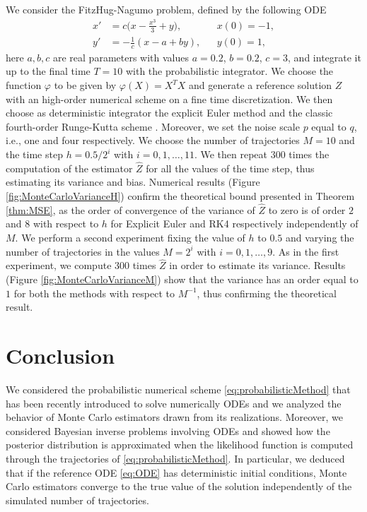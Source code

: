 \documentclass{siamart1116}
\numberwithin{theorem}{section}
\renewcommand{\phi}{\varphi}
\begin{document}
We consider the FitzHug-Nagumo problem, defined by the following ODE
\begin{equation}\label{eq:FitzNag}
\begin{aligned}
	x' &= c\big(x - \frac{x^3}{3} + y\big), && x(0) = -1, \\
	y' &= -\frac{1}{c}(x - a + by), && y(0) = 1,
\end{aligned}
\end{equation}
here $a, b, c$ are real parameters with values $a = 0.2$, $b = 0.2$, $c = 3$, and integrate it up to the final time $T = 10$ with the probabilistic integrator. We choose the function $\phi$ to be given by $\phi(X) = X^TX$ and generate a reference solution $Z$ with an high-order numerical scheme on a fine time discretization. We then choose as deterministic integrator the explicit Euler method and the classic fourth-order Runge-Kutta scheme \cite{HLW02}. Moreover, we set the noise scale $p$ equal to $q$, i.e., one and four respectively. We choose the number of trajectories $M = 10$ and the time step $h = 0.5 / 2^i$ with $i = 0, 1, \ldots, 11$. We then repeat $300$ times the computation of the estimator $\hat Z$ for all the values of the time step, thus estimating its variance and bias. Numerical results (Figure \ref{fig:MonteCarloVarianceH}) confirm the theoretical bound presented in Theorem \ref{thm:MSE}, as the order of convergence of the variance of $\hat{Z}$ to zero is of order $2$ and $8$ with respect to $h$ for Explicit Euler and RK4 respectively independently of $M$. We perform a second experiment fixing the value of $h$ to $0.5$ and varying the number of trajectories in the values $M = 2^i$ with $i = 0, 1, \ldots, 9$. As in the first experiment, we compute 300 times $\hat Z$ in order to estimate its variance. Results (Figure \ref{fig:MonteCarloVarianceM}) show that the variance has an order equal to $1$ for both the methods with respect to $M^{-1}$, thus confirming the theoretical result.

\section{Conclusion} We considered the probabilistic numerical scheme \eqref{eq:probabilisticMethod} that has been recently introduced \cite{CGS16} to solve numerically ODEs and we analyzed the behavior of Monte Carlo estimators drawn from its realizations. Moreover, we considered Bayesian inverse problems involving ODEs and showed how the posterior distribution is approximated when the likelihood function is computed through the trajectories of \eqref{eq:probabilisticMethod}. In particular, we deduced that if the reference ODE \eqref{eq:ODE} has deterministic initial conditions, Monte Carlo estimators converge to the true value of the solution independently of the simulated number of trajectories.



\end{document}
